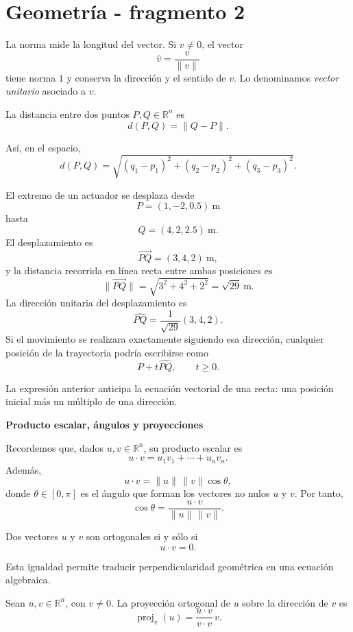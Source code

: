 \section{Geometría - fragmento 2}
La norma mide la longitud del vector. Si $v\neq0$, el vector
\[
\widehat v=\frac{v}{\|v\|}
\]
tiene norma $1$ y conserva la dirección y el sentido de $v$. Lo denominamos \emph{vector unitario} asociado a $v$.

\begin{definition}
La distancia entre dos puntos $P,Q\in\mathbb{R}^n$ es
\[
d(P,Q)=\|Q-P\|.
\]
\end{definition}

Así, en el espacio,
\[
d(P,Q)
=\sqrt{(q_1-p_1)^2+(q_2-p_2)^2+(q_3-p_3)^2}.
\]

\begin{example}
El extremo de un actuador se desplaza desde
\[
P=(1,-2,0.5)\ \mathrm{m}
\]
hasta
\[
Q=(4,2,2.5)\ \mathrm{m}.
\]
El desplazamiento es
\[
\overrightarrow{PQ}=(3,4,2)\ \mathrm{m},
\]
y la distancia recorrida en línea recta entre ambas posiciones es
\[
\|\overrightarrow{PQ}\|
=\sqrt{3^2+4^2+2^2}
=\sqrt{29}\ \mathrm{m}.
\]
La dirección unitaria del desplazamiento es
\[
\widehat{PQ}=\frac{1}{\sqrt{29}}(3,4,2).
\]
Si el movimiento se realizara exactamente siguiendo esa dirección, cualquier posición de la trayectoria podría escribirse como
\[
P+t\widehat{PQ},\qquad t\geq0.
\]
\end{example}

La expresión anterior anticipa la ecuación vectorial de una recta: una posición inicial más un múltiplo de una dirección.

\textbf{Producto escalar, ángulos y proyecciones}

Recordemos que, dados $u,v\in\mathbb{R}^n$, su producto escalar es
\[
u\cdot v=u_1v_1+\cdots+u_nv_n.
\]
Además,
\[
u\cdot v=\|u\|\,\|v\|\cos\theta,
\]
donde $\theta\in[0,\pi]$ es el ángulo que forman los vectores no nulos $u$ y $v$. Por tanto,
\[
\cos\theta=\frac{u\cdot v}{\|u\|\,\|v\|}.
\]

\begin{proposition}
Dos vectores $u$ y $v$ son ortogonales si y sólo si
\[
u\cdot v=0.
\]
\end{proposition}

Esta igualdad permite traducir perpendicularidad geométrica en una ecuación algebraica.

\begin{definition}
Sean $u,v\in\mathbb{R}^n$, con $v\neq0$. La proyección ortogonal de $u$ sobre la dirección de $v$ es
\[
\operatorname{proj}_v(u)
=\frac{u\cdot v}{v\cdot v}\,v.
\]
\end{definition}


